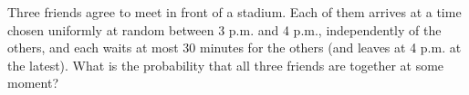 Three friends agree to meet in front of a stadium. Each of them arrives at a time chosen uniformly at random between 3 p.m. and 4 p.m., independently of the others, and each waits at most $30$ minutes for the others (and leaves at 4 p.m. at the latest). What is the probability that all three friends are together at some moment?
